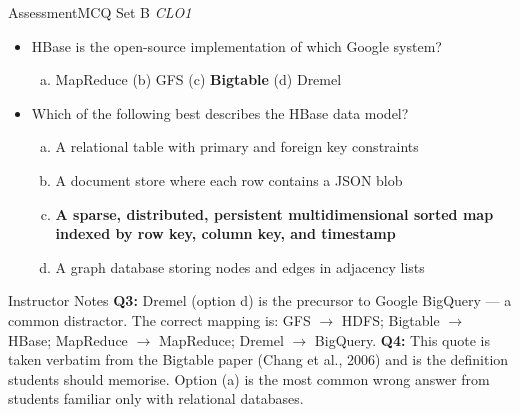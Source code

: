 \documentclass[aspectratio=169,10pt]{beamer}
\begin{document}
\begin{frame}{Assessment\textemdash MCQ Set B \hfill\small\textit{CLO1}}
  \vspace{6pt}
  \begin{itemize}
    \item[\textbf{Q3.}] HBase is the open-source implementation of which Google system?
    \begin{enumerate}[(a)]
      \item MapReduce \quad (b) GFS \quad (c) \textbf{Bigtable} \quad (d) Dremel
    \end{enumerate}
  \end{itemize}
  \vspace{8pt}
  \begin{itemize}
    \item[\textbf{Q4.}] Which of the following best describes the HBase data model?
    \begin{enumerate}[(a)]
      \item A relational table with primary and foreign key constraints
      \item A document store where each row contains a JSON blob
      \item \textbf{A sparse, distributed, persistent multidimensional sorted map indexed by row key, column key, and timestamp}
      \item A graph database storing nodes and edges in adjacency lists
    \end{enumerate}
  \end{itemize}
  \vspace{8pt}
  \begin{alertblock}{Instructor Notes}
    \textbf{Q3:} Dremel (option d) is the precursor to Google BigQuery — a common distractor.  The correct mapping is: GFS $\to$ HDFS; Bigtable $\to$ HBase; MapReduce $\to$ MapReduce; Dremel $\to$ BigQuery.  \textbf{Q4:} This quote is taken verbatim from the Bigtable paper (Chang et al., 2006) and is the definition students should memorise.  Option (a) is the most common wrong answer from students familiar only with relational databases.
  \end{alertblock}
\end{frame}
\end{document}
